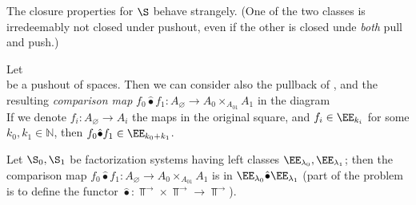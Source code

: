 \begin{remark}		
The closure properties for $\S$ behave strangely. (One of the two classes is irredeemably not closed under pushout, even if the other is closed unde \emph{both} pull and push.)		
\end{remark}		
\begin{theorem}		
Let		
\[		
\]		
be a pushout of spaces. Then we can consider also the pullback of $ $, and the resulting \emph{comparison map} $f_0\hat{\bullet} f_1 \colon A_\varnothing \to A_0 \times_{A_{01}} A_1$ in the diagram		
\[		
%		
\]		
If we denote $f_i \colon A_\varnothing \to A_i$ the maps in the original square, and $f_i\in \EE_{k_i}$ for some $k_0, k_1\in\mathbb{N}$, then $f_0\hat{\bullet} f_1\in \EE_{k_0 + k_1}$.		
\end{theorem}		
Let $\S_0, \S_1$ be factorization systems having left classes $\EE_{\lambda_0}, \EE_{\lambda_1}$; then the comparison map $f_0\hat{\bullet} f_1 \colon A_\varnothing \to A_0 \times_{A_{01}} A_1$ is in $\EE_{\lambda_0}\hat\bullet \EE_{\lambda_1}$ (part of the problem is to define the functor $\hat\bullet \colon \Top^\to \times \Top^\to \to \Top^\to$).		
